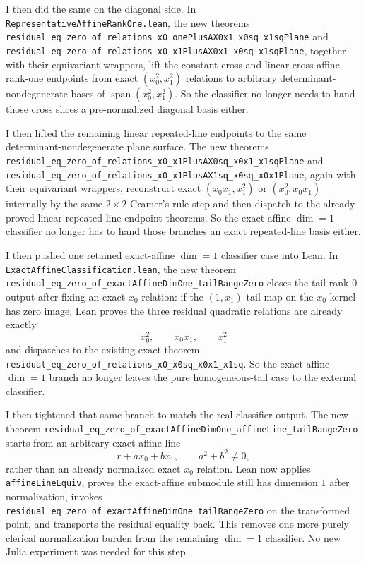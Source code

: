 \documentclass[11pt]{article}
\begin{document}
I then did the same on the diagonal side. In
\texttt{RepresentativeAffineRankOne.lean}, the new theorems
\texttt{residual\_eq\_zero\_of\_relations\_x0\_onePlusAX0x1\_x0sq\_x1sqPlane}
and
\texttt{residual\_eq\_zero\_of\_relations\_x0\_x1PlusAX0x1\_x0sq\_x1sqPlane},
together with their equivariant wrappers, lift the constant-cross and
linear-cross affine-rank-one endpoints from exact \((x_0^2,x_1^2)\) relations
to arbitrary determinant-nondegenerate bases of
\(\operatorname{span}(x_0^2,x_1^2)\). So the classifier no longer needs to
hand those cross slices a pre-normalized diagonal basis either.

I then lifted the remaining linear repeated-line endpoints to the same
determinant-nondegenerate plane surface. The new theorems
\texttt{residual\_eq\_zero\_of\_relations\_x0\_x1PlusAX0sq\_x0x1\_x1sqPlane}
and
\texttt{residual\_eq\_zero\_of\_relations\_x0\_x1PlusAX1sq\_x0sq\_x0x1Plane},
again with their equivariant wrappers, reconstruct exact
\((x_0x_1,x_1^2)\) or \((x_0^2,x_0x_1)\) internally by the same \(2\times2\)
Cramer's-rule step and then dispatch to the already proved linear repeated-line
endpoint theorems. So the exact-affine \(\dim=1\) classifier no longer has to
hand those branches an exact repeated-line basis either.

I then pushed one retained exact-affine \(\dim=1\) classifier case into Lean.
In \texttt{ExactAffineClassification.lean}, the new theorem
\texttt{residual\_eq\_zero\_of\_exactAffineDimOne\_tailRangeZero} closes the
tail-rank \(0\) output after fixing an exact \(x_0\) relation: if the
\((1,x_1)\)-tail map on the \(x_0\)-kernel has zero image, Lean proves the
three residual quadratic relations are already exactly
\[
  x_0^2,\qquad x_0x_1,\qquad x_1^2
\]
and dispatches to the existing exact theorem
\texttt{residual\_eq\_zero\_of\_relations\_x0\_x0sq\_x0x1\_x1sq}. So the
exact-affine \(\dim=1\) branch no longer leaves the pure homogeneous-tail case
to the external classifier.

I then tightened that same branch to match the real classifier output. The new
theorem
\texttt{residual\_eq\_zero\_of\_exactAffineDimOne\_affineLine\_tailRangeZero}
starts from an arbitrary exact affine line
\[
  r + a x_0 + b x_1,\qquad a^2+b^2\neq 0,
\]
rather than an already normalized exact \(x_0\) relation. Lean now applies
\texttt{affineLineEquiv}, proves the exact-affine submodule still has
dimension \(1\) after normalization, invokes
\texttt{residual\_eq\_zero\_of\_exactAffineDimOne\_tailRangeZero} on the
transformed point, and transports the residual equality back. This removes one
more purely clerical normalization burden from the remaining \(\dim=1\)
classifier. No new Julia experiment was needed for this step.
\end{document}
